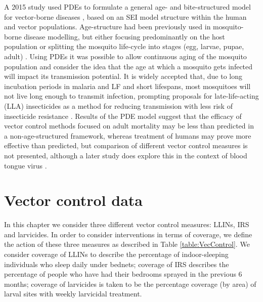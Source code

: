 A 2015 study used PDEs to formulate a general age- and bite-structured model for vector-borne diseases \cite{Rock2015}, based on an SEI model structure within the human and vector populations. Age-structure had been previously used in mosquito-borne disease modelling, but either focusing predominantly on the host population \cite{Hethcote1985,Geisse2012} or splitting the mosquito life-cycle into stages (egg, larvae, pupae, adult) \cite{Hancock2007}. Using PDEs it was possible to allow continuous aging of the mosquito population and consider the idea that the age at which a mosquito gets infected will impact its transmission potential. It is widely accepted that, due to long incubation periods in malaria and LF and short lifespans, most mosquitoes will not live long enough to transmit infection, prompting proposals for late-life-acting (LLA) insecticides as a method for reducing transmission with less risk of insecticide resistance \cite{Read2009}. Results of the PDE model suggest that the efficacy of vector control methods focused on adult mortality may be less than predicted in a non-age-structured framework, whereas treatment of humans may prove more effective than predicted, but comparison of different vector control measures is not presented, although a later study does explore this in the context of blood tongue virus \cite{Brand2016}.

\section{Vector control data}
\label{sec:VCdata}

In this chapter we consider three different vector control measures: LLINs, IRS and larvicides. In order to consider interventions in terms of coverage, we define the action of these three measures as described in Table \ref{table:VecControl}. We consider coverage of LLINs to describe the percentage of indoor-sleeping individuals who sleep daily under bednets; coverage of IRS describes the percentage of people who have had their bedrooms sprayed in the previous 6 months; coverage of larvicides is taken to be the percentage coverage (by area) of larval sites with weekly larvicidal treatment.

